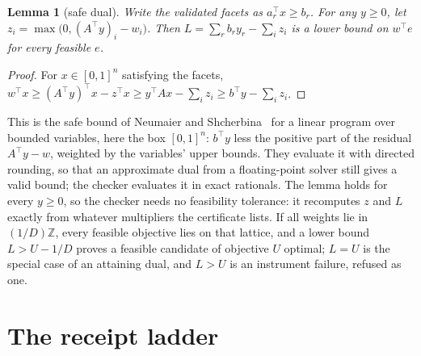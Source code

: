 \documentclass[aps,pra,twocolumn,superscriptaddress,nofootinbib,longbibliography,floatfix]{revtex4-2}
\newtheorem{lemma}{Lemma}
\begin{document}
\begin{lemma}[safe dual]
Write the validated facets as $a_r^\top x\ge b_r$. For any $y\ge0$, let $z_i=\max\bigl(0,(A^\top y)_i-w_i\bigr)$. Then $L=\sum_r b_r y_r-\sum_i z_i$ is a lower bound on $w^\top e$ for every feasible $e$.
\end{lemma}
\begin{proof}
For $x\in[0,1]^n$ satisfying the facets, $w^\top x\ge (A^\top y)^\top x-z^\top x\ge y^\top Ax-\sum_i z_i\ge b^\top y-\sum_i z_i$.
\end{proof}
This is the safe bound of Neumaier and Shcherbina~\cite{neumaier2004safe} for a linear program over bounded variables, here the box $[0,1]^n$: $b^\top y$ less the positive part of the residual $A^\top y-w$, weighted by the variables' upper bounds. They evaluate it with directed rounding, so that an approximate dual from a floating-point solver still gives a valid bound; the checker evaluates it in exact rationals. The lemma holds for every $y\ge 0$, so the checker needs no feasibility tolerance: it recomputes $z$ and $L$ exactly from whatever multipliers the certificate lists. If all weights lie in $(1/D)\mathbb{Z}$, every feasible objective lies on that lattice, and a lower bound $L>U-1/D$ proves a feasible candidate of objective $U$ optimal; $L=U$ is the special case of an attaining dual, and $L>U$ is an instrument failure, refused as one.

\section{The receipt ladder}
\label{sec:ladder}
\end{document}
